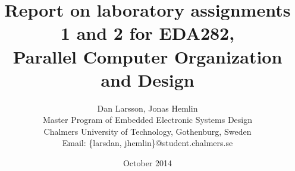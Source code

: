 \documentclass[a4paper]{article}
\title{Report on laboratory assignments 1 and 2 for EDA282, \\ Parallel Computer Organization and Design}
\date{October 2014}
\author{Dan Larsson, Jonas Hemlin
\\Master Program of Embedded Electronic Systems Design\\
Chalmers University of Technology, Gothenburg, Sweden\\
Email: \{larsdan, jhemlin\}@student.chalmers.se}
\begin{document}
\maketitle




\newpage
\begin{appendices}

\end{appendices}
\end{document}
